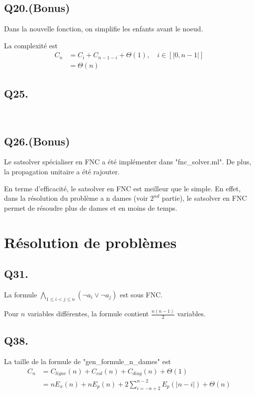     \subsection*{Q20.(Bonus)}
    Dans la nouvelle fonction, on simplifie les enfants avant le noeud.
    
    La complexité est
    \begin{align*}
        C_n &= C_{i} + C_{n-1-i} + \Theta(1), \quad i \in [|0, n-1|]\\
        &= \Theta(n)
    \end{align*}
    
    \subsection*{Q25.}~
    
    \subsection*{Q26.(Bonus)}
    Le satsolver spécialiser en FNC a été implémenter dans "fnc\_solver.ml".
    De plus, la propagation unitaire a été rajouter.
    
    En terme d'efficacité, le satsolver en FNC est meilleur que le simple.
    En effet, dans la résolution du problème a n dames (voir $2^{nd}$ partie),
    le satsolver en FNC permet de résoudre plus de dames et en moins de temps.
    
    \section{Résolution de problèmes}
    \subsection*{Q31.}
    La formule
    $\bigwedge\limits_{1 \leq i < j \leq n}\left(\lnot a_i \lor \lnot a_j\right)$
    est sous FNC.
    
    Pour $n$ variables différentes, la formule contient $\frac{n(n-1)}{2}$ variables.
    
    \subsection*{Q38.}
    La taille de la formule de "gen\_formule\_n\_dames" est
    \begin{align*}
        C_n &= C_{ligne}(n) + C_{col}(n) + C_{diag}(n) + \Theta(1)\\
        &= nE_x(n) + nE_p(n) + 2\sum_{i=-n+2}^{n-2}E_p(|n-i|) + \Theta(n)\\
    \end{align*}
    
